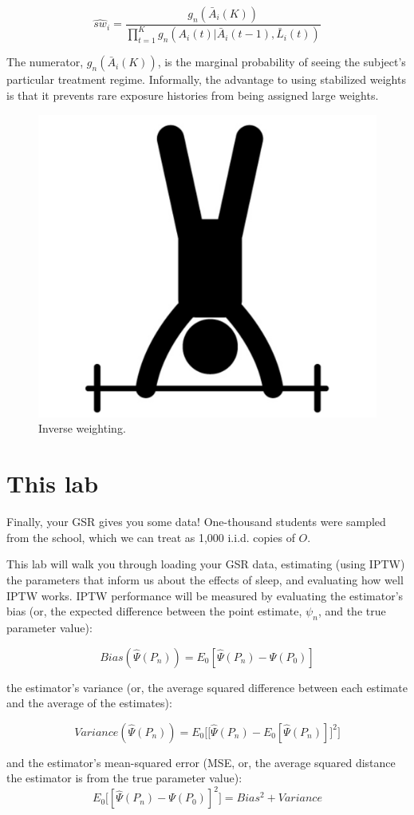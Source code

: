 \documentclass[answers]{exam}
\begin{document}
\[
\hat{sw}_i = \frac{g_n(\bar{A}_i(K))}{\prod_{t=1}^Kg_n(A_i(t)|\bar{A}_i(t-1), \bar{L}_i(t))}
\]

\noindent The numerator, $g_n(\bar{A}_i(K))$, is the marginal probability of seeing the subject's particular treatment regime. Informally, the advantage to using stabilized weights is that it prevents rare exposure histories from being assigned large weights.


\begin{figure}
\begin{center}
\includegraphics[width=.35\textwidth]{IPTWpic.png}
\caption{Inverse weighting.}
\end{center}
\end{figure}

\section{This lab}

Finally, your GSR gives you some data! One-thousand students were sampled from the school, which we can treat as 1,000 i.i.d. copies of $O$.

\noindent This lab will walk you through loading your GSR data, estimating (using IPTW) the parameters that inform us about the effects of sleep, and evaluating how well IPTW works. IPTW performance will be measured by evaluating the estimator's bias (or, the expected difference between the point estimate, $\psi_n$, and the true parameter value):

\[
Bias(\hat{\Psi}(P_n)) = E_0[\hat{\Psi}(P_n) - \Psi(P_0)]
\]

\noindent the estimator's variance (or, the average squared difference between each estimate and the average of the estimates):

\[
Variance(\hat{\Psi}(P_n)) = E_0\Bigg[\Big[\hat{\Psi}(P_n) - E_0[\hat{\Psi}(P_n)]\Big]^2\Bigg]
\]

\noindent and the estimator's mean-squared error (MSE, or, the average squared distance the estimator is from the true parameter value):
\[
E_0\Big[[\hat{\Psi}(P_n) - \Psi(P_0)]^2\Big] = Bias^2 + Variance
\]
\end{document}
